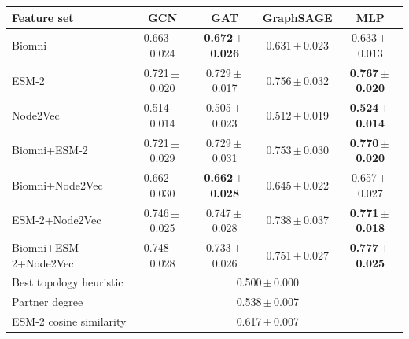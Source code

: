 \begin{tabular}{lcccc}
\toprule
Feature set & GCN & GAT & GraphSAGE & MLP \\
\midrule
Biomni & 0.663\,$\pm$\,0.024 & \textbf{0.672\,$\pm$\,0.026} & 0.631\,$\pm$\,0.023 & 0.633\,$\pm$\,0.013 \\
ESM-2 & 0.721\,$\pm$\,0.020 & 0.729\,$\pm$\,0.017 & 0.756\,$\pm$\,0.032 & \textbf{0.767\,$\pm$\,0.020} \\
Node2Vec & 0.514\,$\pm$\,0.014 & 0.505\,$\pm$\,0.023 & 0.512\,$\pm$\,0.019 & \textbf{0.524\,$\pm$\,0.014} \\
Biomni+ESM-2 & 0.721\,$\pm$\,0.029 & 0.729\,$\pm$\,0.031 & 0.753\,$\pm$\,0.030 & \textbf{0.770\,$\pm$\,0.020} \\
Biomni+Node2Vec & 0.662\,$\pm$\,0.030 & \textbf{0.662\,$\pm$\,0.028} & 0.645\,$\pm$\,0.022 & 0.657\,$\pm$\,0.027 \\
ESM-2+Node2Vec & 0.746\,$\pm$\,0.025 & 0.747\,$\pm$\,0.028 & 0.738\,$\pm$\,0.037 & \textbf{0.771\,$\pm$\,0.018} \\
Biomni+ESM-2+Node2Vec & 0.748\,$\pm$\,0.028 & 0.733\,$\pm$\,0.026 & 0.751\,$\pm$\,0.027 & \textbf{0.777\,$\pm$\,0.025} \\
\midrule
Best topology heuristic & \multicolumn{4}{c}{0.500\,$\pm$\,0.000} \\
Partner degree & \multicolumn{4}{c}{0.538\,$\pm$\,0.007} \\
ESM-2 cosine similarity & \multicolumn{4}{c}{0.617\,$\pm$\,0.007} \\
\bottomrule
\end{tabular}
